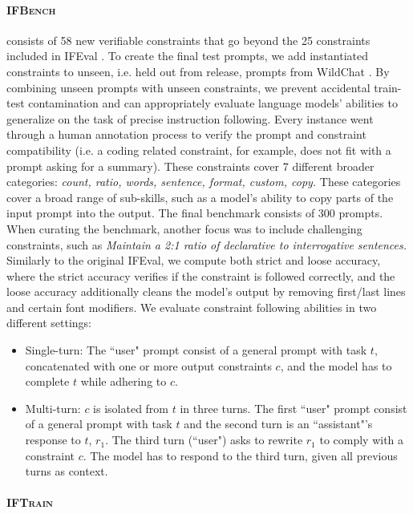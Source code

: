 \documentclass{article}
\newcommand{\benchname}{\textsc{IFBench}\xspace}
\newcommand{\trainname}{\textsc{IFTrain}\xspace}
\begin{document}
\paragraph{\benchname} consists of 58 new verifiable constraints that go beyond the 25 constraints included in IFEval \cite{zhou2023instruction}. 
To create the final test prompts, we add instantiated constraints to unseen, i.e. held out from release, prompts from WildChat \cite{zhao2024wildchat}. By combining unseen prompts with unseen constraints, we prevent accidental train-test contamination and can appropriately evaluate language models' abilities to generalize on the task of precise instruction following. Every instance went through a human annotation process to verify the prompt and constraint compatibility (i.e. a coding related constraint, for example, does not fit with a prompt asking for a summary). These  constraints cover 7 different broader categories: {\it count, ratio, words, sentence, format, custom, copy.}
These categories cover a broad range of sub-skills, such as a model's ability to copy parts of the input prompt into the output. The final benchmark consists of 300 prompts. When curating the benchmark, another focus was to include challenging constraints, such as \textit{Maintain a 2:1 ratio of declarative to interrogative sentences.} Similarly to the original IFEval, we compute both strict and loose accuracy, where the strict accuracy verifies if the constraint is followed correctly, and the loose accuracy additionally cleans the model's output by removing first/last lines and certain font modifiers. We evaluate constraint following abilities in two different settings:

\begin{itemize}
    \item Single-turn: The ``user" prompt consist of a general prompt with task $t$, concatenated with one or more output constraints $c$, and the model has to complete $t$ while adhering to $c$.
    \item Multi-turn: $c$ is isolated from $t$ in three turns. The first ``user" prompt consist of a general prompt with task $t$ and the second turn is an ``assistant"'s response to $t$, $r_1$. The third turn (``user") asks to rewrite $r_1$ to comply with a constraint $c$. The model has to respond to the third turn, given all previous turns as context.
\end{itemize}


\paragraph{\trainname}
\end{document}

